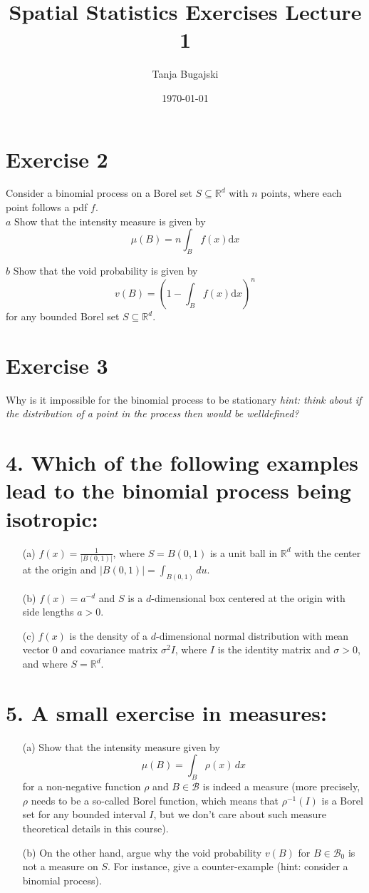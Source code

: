 \documentclass{article}
\title{Spatial Statistics Exercises Lecture 1}
\author{Tanja Bugajski}
\date{\today}
\begin{document}
\maketitle

\section*{Exercise 2}
Consider a binomial process on a Borel set $S\subseteq \mathbb{R}^d$ with $n$ points, where
each point follows a pdf $f$. \\
\(a\) Show that the intensity measure is given by
\[
\mu(B)=n\int_B f(x) \text{d}x
\]

\(b\)  Show that the void probability is given by
\[
v(B)=\left( 1-\int_B f(x) \text{d}x \right)^n
\]
for any bounded Borel set $S\subseteq \mathbb{R}^d$.
\section*{Exercise 3}
Why is it impossible for the binomial process to be stationary \textit{hint: think
about if the distribution of a point in the process then would be welldefined?}
\section*{4. Which of the following examples lead to the binomial process being isotropic:}
\begin{enumerate}
    \item[(a)] $f(x) = \frac{1}{|B(0, 1)|}$, where $S = B(0, 1)$ is a unit ball in $\mathbb{R}^d$ with the center at the origin and $|B(0, 1)| = \int_{B(0,1)} du$.
    
    \item[(b)] $f(x) = a^{-d}$ and $S$ is a $d$-dimensional box centered at the origin with side lengths $a > 0$.
    
    \item[(c)] $f(x)$ is the density of a $d$-dimensional normal distribution with mean vector 0 and covariance matrix $\sigma^2 I$, where $I$ is the identity matrix and $\sigma > 0$, and where $S = \mathbb{R}^d$.
\end{enumerate}

\section*{5. A small exercise in measures:}
\begin{enumerate}
    \item[(a)] Show that the intensity measure given by
    \[
    \mu(B) = \int_B \rho(x) \, dx
    \]
    for a non-negative function $\rho$ and $B \in \mathcal{B}$ is indeed a measure (more precisely, $\rho$ needs to be a so-called Borel function, which means that $\rho^{-1}(I)$ is a Borel set for any bounded interval $I$, but we don’t care about such measure theoretical details in this course).
    
    \item[(b)] On the other hand, argue why the void probability $v(B)$ for $B \in \mathcal{B}_0$ is not a measure on $S$. For instance, give a counter-example (hint: consider a binomial process).
\end{enumerate}
\end{document}
